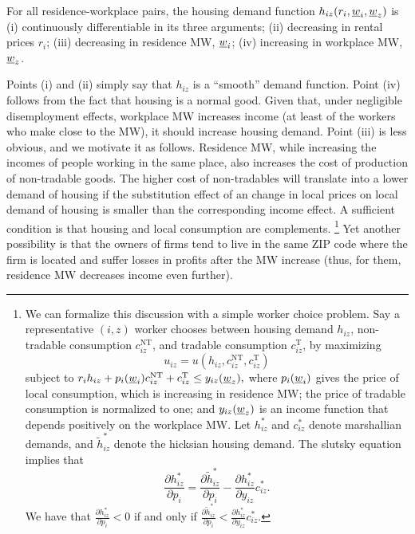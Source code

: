 \begin{assu}\label{assu:housing_function}
	For all residence-workplace pairs, the housing demand function $h_{iz} (r_i, 	
	\underline{w}_i, \underline{w}_z)$ is 
	(i) continuously differentiable in its three arguments;
	(ii) decreasing in rental prices $r_i$;
	(iii) decreasing in residence MW, $\underline{w}_i$;
	(iv) increasing in workplace MW, $\underline{w}_z$.
\end{assu}

Points (i) and (ii) simply say that $h_{iz}$ is a ``smooth'' demand function.
Point (iv) follows from the fact that housing is a normal good.
Given that, under negligible disemployment effects, workplace MW increases income 
(at least of the workers who make close to the MW), it should increase housing 
demand.
Point (iii) is less obvious, and we motivate it as follows.
Residence MW, while increasing the incomes of people working in the same place, 
also increases the cost of production of non-tradable goods.
The higher cost of non-tradables will translate into a lower demand of housing 
if the substitution effect of an change in local prices on local demand of housing
is smaller than the corresponding income effect.
A sufficient condition is that housing and local consumption are complements.%
\footnote{We can formalize this discussion with a simple worker choice problem.
Say a representative $(i,z)$ worker chooses between housing demand $h_{iz}$,
non-tradable consumption $c^{\text{NT}}_{iz}$, and tradable consumption $c^{\text{T}}_{iz}$,
by maximizing
$$u_{iz} = u \left(h_{iz}, c^{\text{NT}}_{iz}, c^{\text{T}}_{iz}\right)$$
subject to 
$r_i h_{iz} + p_i(\underline{w}_i) c^{\text{NT}}_{iz} + c^{\text{T}}_{iz} \leq y_{iz}(\underline{w}_z),$
where $p_i(\underline{w}_i)$ gives the price of local consumption, which is increasing in residence MW;
the price of tradable consumption is normalized to one; and 
$y_{iz}(\underline{w}_z)$ is an income function that depends positively on the workplace MW.
Let $h_{iz}^*$ and $c_{iz}^*$ denote marshallian demands, and 
$\tilde h_{iz}^*$ denote the hicksian housing demand.
The slutsky equation implies that
$$\frac{\partial h_{iz}^*}{\partial p_i} 
   = \frac{\partial \tilde h_{iz}^*}{\partial p_i} 
   - \frac{\partial h_{iz}^*}{\partial y_{iz}} c_{iz}^*.$$
We have that $\frac{\partial h_{iz}^*}{\partial p_i} < 0$ if and only if 
$\frac{\partial \tilde h_{iz}^*}{\partial p_i} 
< \frac{\partial h_{iz}^*}{\partial y_{iz}} c_{iz}^*$.}
Yet another possibility is that the owners of firms tend to live in the same ZIP 
code where the firm is located and suffer losses in profits after the MW increase 
(thus, for them, residence MW decreases income even further).

